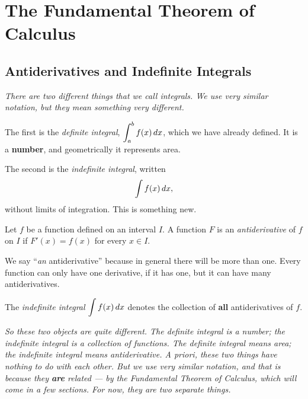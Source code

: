 \chapter{The Fundamental Theorem of Calculus}

\section{Antiderivatives and Indefinite Integrals}
\label{sec:8.1}

\textit{There are two different things that we call integrals.  We use very similar notation, but they mean something very different.}

The first is the \emph{definite integral}, $\displaystyle\int_{a}^{b} f(x)\,dx$, which we have already defined.  It is a \textbf{number}, and geometrically it represents area.

The second is the \emph{indefinite integral}, written
\[
  \int f(x)\,dx,
\]
without limits of integration.  This is something new.

\begin{definition}[Antiderivative]
\label{def:8-1}
Let $f$ be a function defined on an interval $I$.  A function $F$ is an \emph{antiderivative} of $f$ on $I$ if $F'(x) = f(x)$ for every $x \in I$.
\end{definition}

\begin{remark}
We say ``\textit{an} antiderivative'' because in general there will be more than one.  Every function can only have one derivative, if it has one, but it can have many antiderivatives.
\end{remark}

\begin{definition}
\label{def:8-2}
The \emph{indefinite integral} $\displaystyle\int f(x)\,dx$ denotes the collection of \textbf{all} antiderivatives of $f$.
\end{definition}

\textit{So these two objects are quite different.  The definite integral is a number; the indefinite integral is a collection of functions.  The definite integral means area; the indefinite integral means antiderivative.  A priori, these two things have nothing to do with each other.  But we use very similar notation, and that is because they \textbf{are} related --- by the Fundamental Theorem of Calculus, which will come in a few sections.  For now, they are two separate things.}


